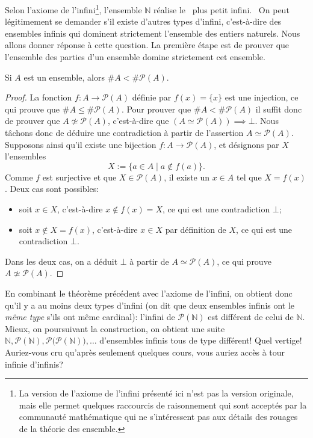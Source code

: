 \documentclass[french,course,oneside,theoremnosection]{lecture}
\newcommand{\N}{\mathbb{N}}
\begin{document}
Selon l'axiome de l'infini\footnote{La version de l'axiome de l'infini présenté ici n'est pas la version originale, mais elle permet quelques raccourcis de raisonnement qui sont acceptés par la communauté mathématique qui ne s'intéressent pas aux détails des rouages de la théorie des ensemble.}, l'ensemble $\N$ réalise le \og~plus petit infini.~\fg{} On peut légitimement se demander s'il existe d'autres types d'infini, c'est-à-dire des ensembles infinis qui dominent strictement l'ensemble des entiers naturels. Nous allons donner réponse à cette question. La première étape est de prouver que l'ensemble des parties d'un ensemble domine strictement cet ensemble.
\begin{theorem}
Si $A$ est un ensemble, alors $\#A < \#\mathcal{P}(A)$.
\end{theorem}
\begin{proof}
La fonction $f\colon A \to  \mathcal{P}(A)$ définie par $f(x)=\{x\}$ est une injection, ce qui prouve que $\#A \leq \#\mathcal{P}(A)$. Pour prouver que $\#A < \#\mathcal{P}(A)$ il suffit donc de prouver que $A \not\simeq \mathcal{P}(A)$, c'est-à-dire que $(A \simeq \mathcal{P}(A)) \implies \bot$. Nous tâchons donc de déduire une contradiction à partir de l'assertion $A \simeq \mathcal{P}(A)$. Supposons ainsi qu'il existe une bijection $f\colon A \to \mathcal{P}(A)$, et désignons par $X$ l'ensembles
\[
X:=\{a \in A \mid a \not\in f(a)\}.
\]
Comme $f$ est surjective et que $X\in \mathcal{P}(A)$, il existe un $x\in A$ tel que $X=f(x)$. Deux cas sont possibles:
\begin{itemize}
\item soit $x\in X$, c'est-à-dire $x\not\in f(x)=X$, ce qui est une contradiction $\bot$;
\item soit $x\not\in X=f(x)$, c'est-à-dire $x\in X$ par définition de $X$, ce qui est une contradiction $\bot$.
\end{itemize}
Dans les deux cas, on a déduit $\bot$ à partir de $A \simeq \mathcal{P}(A)$, ce qui prouve $A \not\simeq \mathcal{P}(A)$.
\end{proof}

En combinant le théorème précédent avec l'axiome de l'infini, on obtient donc qu'il y a au moins deux types d'infini (on dit que deux ensembles infinis ont le \emph{même type} s'ils ont même cardinal): l'infini de $\mathcal{P}(\N)$ est différent de celui de $\N$. Mieux, on poursuivant la construction, on obtient une suite $\N, \mathcal{P}(\N), \mathcal{P}\big(\mathcal{P}(\N)\big), \ldots$ d'ensembles infinis tous de type différent! Quel vertige! Auriez-vous cru qu'après seulement quelques cours, vous auriez accès à tour infinie d'infinis?
\end{document}
